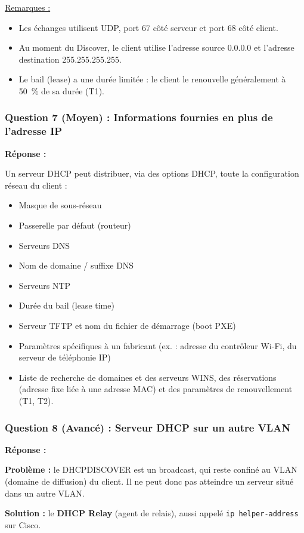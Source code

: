 \documentclass[12pt,a4paper]{article}
\newcommand{\reponse}{\textbf{Réponse :}\par}
\begin{document}
\underline{Remarques :}
\begin{itemize}
    \item Les échanges utilisent UDP, port 67 côté serveur et port 68
    côté client.
    \item Au moment du Discover, le client utilise l'adresse source
    0.0.0.0 et l'adresse destination 255.255.255.255.
    \item Le bail (lease) a une durée limitée : le client le renouvelle
    généralement à 50~\% de sa durée (T1).
\end{itemize}

\subsubsection*{Question 7 (Moyen) : Informations fournies en plus de l'adresse IP}

\reponse
Un serveur DHCP peut distribuer, via des options DHCP, toute la
configuration réseau du client :
\begin{itemize}
    \item Masque de sous-réseau
    \item Passerelle par défaut (routeur)
    \item Serveurs DNS
    \item Nom de domaine / suffixe DNS
    \item Serveurs NTP
    \item Durée du bail (lease time)
    \item Serveur TFTP et nom du fichier de démarrage (boot PXE)
    \item Paramètres spécifiques à un fabricant (ex. : adresse du
    contrôleur Wi-Fi, du serveur de téléphonie IP)
    \item Liste de recherche de domaines et des serveurs WINS, des
    réservations (adresse fixe liée à une adresse MAC) et des paramètres
    de renouvellement (T1, T2).
\end{itemize}

\subsubsection*{Question 8 (Avancé) : Serveur DHCP sur un autre VLAN}

\reponse
\textbf{Problème :} le DHCPDISCOVER est un broadcast, qui reste confiné
au VLAN (domaine de diffusion) du client. Il ne peut donc pas atteindre
un serveur situé dans un autre VLAN.

\textbf{Solution :} le \textbf{DHCP Relay} (agent de relais), aussi
appelé \texttt{ip helper-address} sur Cisco.
\end{document}
